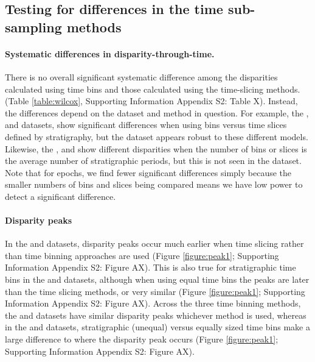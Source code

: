 \documentclass[12pt,a4paper]{article}
\begin{document}
\subsection{Testing for differences in the time sub-sampling methods}

\paragraph{Systematic differences in disparity-through-time.} 
There is no overall significant systematic difference among the disparities calculated using time bins and those calculated using the time-slicing methods. (Table \ref{table:wilcox}, Supporting Information Appendix S2: Table X). %
Instead, the differences depend on the dataset and method in question.
For example, the \cite{brusatte2014gradual}, \cite{bapst2016topology} and \cite{wright2017bayesian} datasets, show significant differences when using bins versus time slices defined by stratigraphy, but the \cite{beckancient2014} dataset appears robust to these different models.
Likewise, the \cite{beckancient2014}, \cite{brusatte2014gradual} and \cite{bapst2016topology} show different disparities when the number of bins or slices is the average number of stratigraphic periods, but this is not seen in the \cite{wright2017bayesian} dataset.
Note that for epochs, we find fewer significant differences simply because the smaller numbers of bins and slices being compared means we have low power to detect a significant difference.

   
  \label{table:wilcox}  

\paragraph{Disparity peaks}
In the \cite{beckancient2014} and \cite{brusatte2014gradual} datasets, disparity peaks occur much earlier when time slicing rather than time binning approaches are used (Figure \ref{figure:peak1}; Supporting Information Appendix S2: Figure AX). %
This is also true for stratigraphic time bins in the \cite{bapst2016topology} and \cite{wright2017bayesian} datasets, although when using equal time bins the peaks are later than the time slicing methods, or very similar (Figure \ref{figure:peak1}; Supporting Information Appendix S2: Figure AX). %
Across the three time binning methods, the \cite{beckancient2014} and \cite{brusatte2014gradual} datasets have similar disparity peaks whichever method is used, whereas in the \cite{bapst2016topology} and \cite{wright2017bayesian} datasets, stratigraphic (unequal) versus equally sized time bins make a large difference to where the disparity peak occurs (Figure \ref{figure:peak1}; Supporting Information Appendix S2: Figure AX). %
\end{document}

